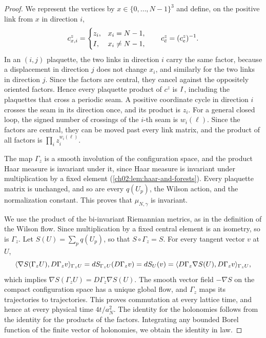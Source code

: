 \begin{proof}
We represent the vertices by $x\in\{0,\dots,N-1\}^3$ and define, on the positive link from $x$ in direction $i$,
\[
 c^z_{x,i}=
 \begin{cases}
 z_i,&x_i=N-1,\\
 I,&x_i\ne N-1,
 \end{cases}
 \qquad c^z_{\bar e}=(c^z_e)^{-1}.
\]
In an $(i,j)$ plaquette, the two links in direction $i$ carry the same factor, because a displacement in direction $j$ does not change $x_i$, and similarly for the two links in direction $j$. Since the factors are central, they cancel against the oppositely oriented factors. Hence every plaquette product of $c^z$ is $I$, including the plaquettes that cross a periodic seam. A positive coordinate cycle in direction $i$ crosses the seam in its direction once, and its product is $z_i$. For a general closed loop, the signed number of crossings of the $i$-th seam is $w_i(\ell)$. Since the factors are central, they can be moved past every link matrix, and the product of all factors is $\prod_iz_i^{w_i(\ell)}$.

The map $\Gamma_z$ is a smooth involution of the configuration space, and the product Haar measure is invariant under it, since Haar measure is invariant under multiplication by a fixed element (\cref{ch02:lem:haar-and-forests}). Every plaquette matrix is unchanged, and so are every $q(U_p)$, the Wilson action, and the normalization constant. This proves that $\mu_{N,\gamma}$ is invariant.

We use the product of the bi-invariant Riemannian metrics, as in the definition of the Wilson flow. Since multiplication by a fixed central element is an isometry, so is $\Gamma_z$. Let $S(U)=\sum_pq(U_p)$, so that $S\circ\Gamma_z=S$. For every tangent vector $v$ at $U$,
\[
 \langle \nabla S(\Gamma_zU),D\Gamma_zv\rangle_{\Gamma_zU}=dS_{\Gamma_zU}(D\Gamma_zv)=dS_U(v)=\langle D\Gamma_z\nabla S(U),D\Gamma_zv\rangle_{\Gamma_zU},
\]
which implies $\nabla S(\Gamma_zU)=D\Gamma_z\nabla S(U)$. The smooth vector field $-\nabla S$ on the compact configuration space has a unique global flow, and $\Gamma_z$ maps its trajectories to trajectories. This proves commutation at every lattice time, and hence at every physical time $4t/a_N^2$. The identity for the holonomies follows from the identity for the products of the factors. Integrating any bounded Borel function of the finite vector of holonomies, we obtain the identity in law.
\end{proof}

